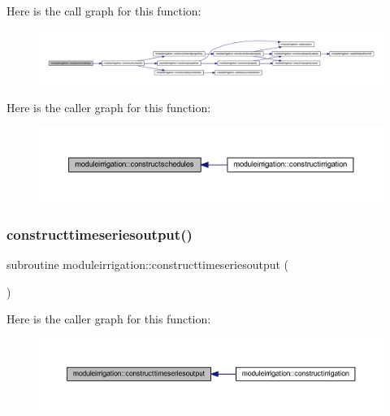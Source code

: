 Here is the call graph for this function\+:\nopagebreak
\begin{figure}[H]
\begin{center}
\leavevmode
\includegraphics[width=350pt]{namespacemoduleirrigation_a6339c6a7568266fb2911688be44e1957_cgraph}
\end{center}
\end{figure}
Here is the caller graph for this function\+:\nopagebreak
\begin{figure}[H]
\begin{center}
\leavevmode
\includegraphics[width=350pt]{namespacemoduleirrigation_a6339c6a7568266fb2911688be44e1957_icgraph}
\end{center}
\end{figure}
\mbox{\label{namespacemoduleirrigation_af6d787a11912e264ab8d53cc1b691f1c}} 
\subsubsection{\texorpdfstring{constructtimeseriesoutput()}{constructtimeseriesoutput()}}
{\footnotesize\ttfamily subroutine moduleirrigation\+::constructtimeseriesoutput (\begin{DoxyParamCaption}{ }\end{DoxyParamCaption})\hspace{0.3cm}{\ttfamily [private]}}

Here is the caller graph for this function\+:\nopagebreak
\begin{figure}[H]
\begin{center}
\leavevmode
\includegraphics[width=350pt]{namespacemoduleirrigation_af6d787a11912e264ab8d53cc1b691f1c_icgraph}
\end{center}
\end{figure}
\mbox{\label{namespacemoduleirrigation_a01348df0fa0c9f40c6462d69d05b875b}} 
